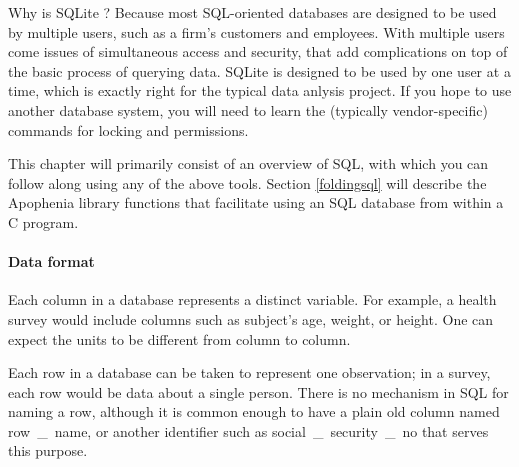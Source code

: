 Why is SQLite ? Because most SQL-oriented databases are
designed to be used by multiple users, such as a firm's customers
and employees. With multiple users come issues of simultaneous access
and security, that add complications on top of the basic process of
querying data. SQLite is designed to be used by one user at a time, which
is exactly right for the typical data anlysis project. If you hope to use another
database system, you will need to learn the (typically vendor-specific)
commands for locking and permissions.


This chapter will primarily consist of an overview of SQL, with which you can
follow along using any of the above tools. Section \ref{foldingsql}
will describe the Apophenia library functions that facilitate using an
SQL database from within a C program.


\paragraph{Data format} Each column in a database represents a distinct
variable. For example, a health survey would include columns such
as subject's age, weight, or height. One can expect the units to be
different from column to column.

Each row in a database can be taken to represent one observation; in a
survey, each row would be data about a single person. There is no
mechanism in SQL for naming a row, although it is common enough to
have a plain old column named \si{row\_name}, or
another identifier such as \si{social\_security\_no} that serves
this purpose.  

